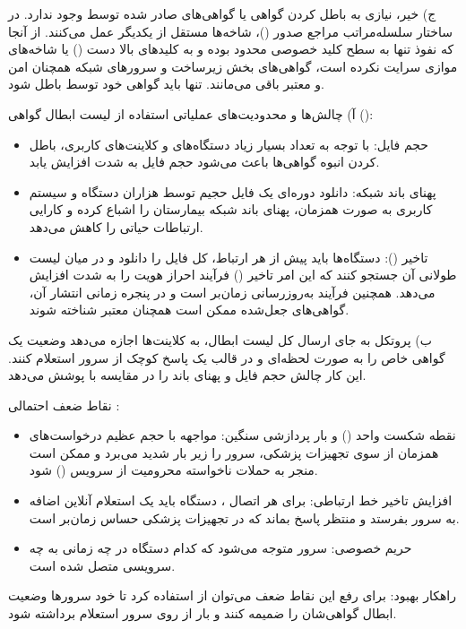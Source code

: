 {ج)} خیر، نیازی به باطل کردن گواهی  یا گواهی‌های صادر شده توسط  وجود ندارد. در ساختار سلسله‌مراتب مراجع صدور ()، شاخه‌ها مستقل از یکدیگر عمل می‌کنند. از آنجا که نفوذ تنها به سطح کلید خصوصی  محدود بوده و به کلیدهای بالا دست () یا شاخه‌های موازی سرایت نکرده است، گواهی‌های بخش زیرساخت و سرورهای شبکه همچنان امن و معتبر باقی می‌مانند. تنها باید گواهی خود  توسط  باطل شود.



{آ)} چالش‌ها و محدودیت‌های عملیاتی استفاده از لیست ابطال گواهی ():
\begin{itemize}
    \item {حجم فایل:} با توجه به تعداد بسیار زیاد دستگاه‌های  و کلاینت‌های کاربری، باطل کردن انبوه گواهی‌ها باعث می‌شود حجم فایل  به شدت افزایش یابد.
    \item {پهنای باند شبکه:} دانلود دوره‌ای یک فایل  حجیم توسط هزاران دستگاه  و سیستم کاربری به صورت همزمان، پهنای باند شبکه بیمارستان را اشباع کرده و کارایی ارتباطات حیاتی را کاهش می‌دهد.
    \item {تاخیر ():} دستگاه‌ها باید پیش از هر ارتباط، کل فایل  را دانلود و در میان لیست طولانی آن جستجو کنند که این امر تاخیر () فرآیند احراز هویت را به شدت افزایش می‌دهد. همچنین فرآیند به‌روزرسانی  زمان‌بر است و در پنجره زمانی انتشار آن، گواهی‌های جعل‌شده ممکن است همچنان معتبر شناخته شوند.
\end{itemize}

{ب)} پروتکل  به جای ارسال کل لیست ابطال، به کلاینت‌ها اجازه می‌دهد وضعیت یک گواهی خاص را به صورت لحظه‌ای و در قالب یک پاسخ کوچک از سرور استعلام کنند. این کار چالش حجم فایل و پهنای باند را در مقایسه با  پوشش می‌دهد.

{نقاط ضعف احتمالی :}
\begin{itemize}
    \item {نقطه شکست واحد () و بار پردازشی سنگین:} مواجهه با حجم عظیم درخواست‌های همزمان از سوی تجهیزات پزشکی، سرور  را زیر بار شدید می‌برد و ممکن است منجر به حملات ناخواسته محرومیت از سرویس () شود.
    \item {افزایش تاخیر خط ارتباطی:} برای هر اتصال ، دستگاه باید یک استعلام آنلاین اضافه به سرور  بفرستد و منتظر پاسخ بماند که در تجهیزات پزشکی حساس زمان‌بر است.
    \item {حریم خصوصی:} سرور  متوجه می‌شود که کدام دستگاه در چه زمانی به چه سرویسی متصل شده است.
\end{itemize}
{راهکار بهبود:} برای رفع این نقاط ضعف می‌توان از  استفاده کرد تا خود سرورها وضعیت ابطال گواهی‌شان را ضمیمه کنند و بار از روی سرور استعلام برداشته شود.


